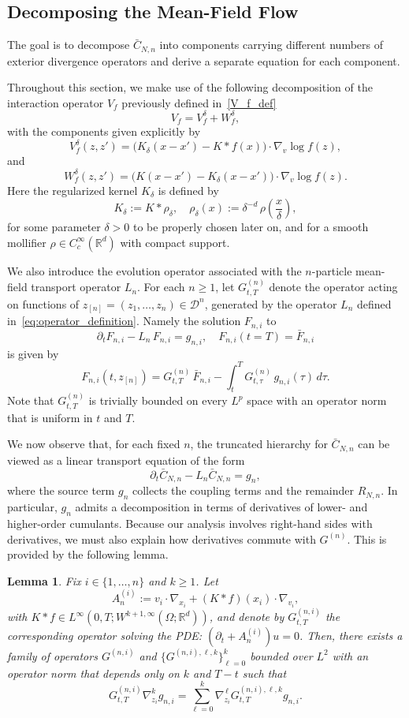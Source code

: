 \documentclass[pdflatex,sn-mathphys-num]{sn-jnl}
\theoremstyle{thmstyleone}%
\theoremstyle{thmstyletwo}%
\theoremstyle{thmstylethree}%
\newtheorem{lemma}{Lemma}
\begin{document}
\subsection{Decomposing the Mean-Field Flow}
The goal is to decompose \(\bar C_{N,n}\) into components carrying different numbers of exterior divergence operators and derive a separate equation for each component.

Throughout this section, we make use of the following decomposition of the interaction operator \(V_f\) previously defined in~\eqref{V_f_def}
\begin{equation}\label{eq:V_f_decomposition}
   V_f = V_f^{\delta} + W_f^{\delta}, 
\end{equation}
with the components given explicitly by
\[
V_{f}^{\delta}(z,z')
= \big( K_{\delta}(x-x') - K \ast f(x) \big)
\cdot \nabla_{v} \log f(z),
\]
and
\[
W_{f}^{\delta}(z,z')
= \big( K(x-x') - K_{\delta}(x-x') \big)
\cdot \nabla_{v} \log f(z).
\]
Here the regularized kernel \(K_{\delta}\) is defined by
\[
K_{\delta} := K \ast \rho_{\delta},
\quad
\rho_{\delta}(x) := \delta^{-d}\,\rho\!\left(\frac{x}{\delta}\right),
\]
for some parameter $\delta >0$ to be properly chosen later on, and for a smooth mollifier \(\rho \in C_c^\infty(\mathbb R^d)\) with compact support.

We also introduce the evolution operator associated with the
\(n\)-particle mean-field transport operator \(L_n\).
For each $n\ge1$, let $G^{(n)}_{t,T}$ denote the operator acting on functions of
$z_{[n]}=(z_1,\dots,z_n)\in\mathcal D^n$, generated by the operator $L_n$ defined in~\eqref{eq:operator_definition}. Namely the solution $F_{n,i}$ to
\[
\partial_t F_{n,i}-L_n\,F_{n,i}=g_{n,i},\quad F_{n,i}(t=T)=\bar F_{n,i}
\]
is given by
\[
F_{n,i}(t,z_{[n]})=G^{(n)}_{t,T}\,\bar F_{n,i}-\int_t^T G^{(n)}_{t,\tau}\,g_{n,i}(\tau)\,d\tau.
\]
Note that $G^{(n)}_{t,T}$ is trivially bounded on every $L^p$ space with an operator norm that is uniform in $t$ and $T$.
\medskip

We now observe that, for each fixed $n$, the truncated hierarchy for $\bar C_{N,n}$ can be viewed as a linear transport equation of the form
\[
\partial_t \bar C_{N,n} - L_n \bar C_{N,n} = g_n,
\]
where the source term $g_n$ collects the coupling terms and the remainder $R_{N,n}$. In particular, $g_n$ admits a decomposition in terms of derivatives of lower- and higher-order cumulants. Because our analysis involves right-hand sides with derivatives, we must also explain how derivatives commute with \(G^{(n)}\).
This is provided by the following lemma.
\begin{lemma} \label{lem:one_particle_k} 
Fix $i\in\{1,\dots,n\}$ and $k\ge 1$.
Let
\[
A_n^{(i)} := v_i\cdot\nabla_{x_i} + (K*f)(x_i)\cdot\nabla_{v_i},
\]
with $K \ast f \in L^{\infty}\left(0,T ;W^{k+1,\infty}(\Omega ; \mathbb{R}^d) \right)$, and denote by $G^{(n,i)}_{t,T}$ the corresponding operator solving the PDE: $( \partial_t+A_n^{(i)} )u=0$.
Then, there exists a family of operators $G^{(n,i)}$ and $\{G^{(n,i),\ell,k}\}_{\ell=0}^k$
bounded over $L^2$ with an operator norm that depends only on $k$ and $T-t$
such that 
\[
G_{t,T}^{(n,i)}\nabla^k_{z_i} g_{n,i}=\sum_{\ell =0}^k\nabla_{z_i}^{\,\ell}
G^{(n,i),\ell,k}_{t,T} g_{n,i}.
\]
\end{lemma}
\end{document}
